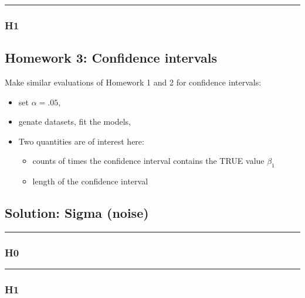 \documentclass[]{article}
\providecommand{\tightlist}{%
  \setlength{\itemsep}{0pt}\setlength{\parskip}{0pt}}
\begin{document}
\begin{center}\rule{0.5\linewidth}{\linethickness}\end{center}

\hypertarget{h1}{%
\subsubsection{H1}\label{h1}}

\hypertarget{homework-3-confidence-intervals}{%
\subsection{Homework 3: Confidence
intervals}\label{homework-3-confidence-intervals}}

Make similar evaluations of Homework 1 and 2 for confidence intervals:

\begin{itemize}
\tightlist
\item
  set \(\alpha=.05\),
\item
  genate datasets, fit the models,
\item
  Two quantities are of interest here:

  \begin{itemize}
  \tightlist
  \item
    counts of times the confidence interval contains the TRUE value
    \(\beta_1\)
  \item
    length of the confidence interval
  \end{itemize}
\end{itemize}

\hypertarget{solution-sigma-noise}{%
\subsection{Solution: Sigma (noise)}\label{solution-sigma-noise}}

\begin{center}\rule{0.5\linewidth}{\linethickness}\end{center}

\hypertarget{h0-1}{%
\subsubsection{H0}\label{h0-1}}

\begin{center}\rule{0.5\linewidth}{\linethickness}\end{center}

\hypertarget{h1-1}{%
\subsubsection{H1}\label{h1-1}}
\end{document}
